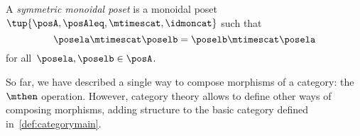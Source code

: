 \begin{ctdefinition}
  \label{def:sym_monoidal_poset}
A \emph{symmetric monoidal poset} is a monoidal poset~$\tup{\posA, \posAleq, \mtimescat, \idmoncat}$ such that
\begin{equation*}
\posela \mtimescat \poselb = \poselb \mtimescat \posela
\end{equation*}
for all~$\posela, \poselb \in \posA$.
\end{ctdefinition}


So far, we have described a single way to compose morphisms of a category: the~$\mthen$ operation.
However, category theory allows to define other ways of composing morphisms, adding structure to the basic category defined in~\cref{def:categorymain}.


